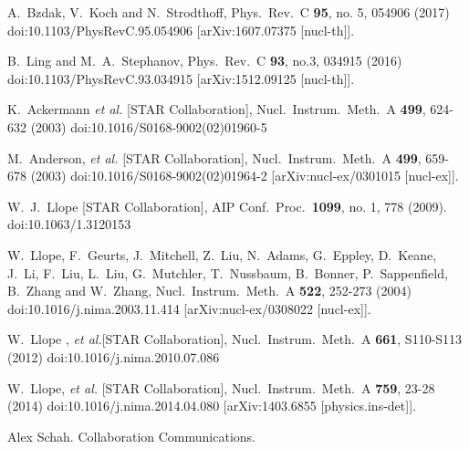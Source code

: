 \begin{thebibliography}{99}
  A.~Bzdak, V.~Koch and N.~Strodthoff,
  Phys.\ Rev.\ C {\bf 95}, no. 5, 054906 (2017)
  doi:10.1103/PhysRevC.95.054906
  [arXiv:1607.07375 [nucl-th]].
  

B.~Ling and M.~A.~Stephanov,
Phys.\ Rev.\ C \textbf{93}, no.3, 034915 (2016)
doi:10.1103/PhysRevC.93.034915
[arXiv:1512.09125 [nucl-th]].

K.~Ackermann \textit{et al.} [STAR Collaboration],
Nucl.\ Instrum.\ Meth.\ A \textbf{499}, 624-632 (2003)
doi:10.1016/S0168-9002(02)01960-5

M.~Anderson, \textit{et al.} [STAR Collaboration],
Nucl.\ Instrum.\ Meth.\ A \textbf{499}, 659-678 (2003)
doi:10.1016/S0168-9002(02)01964-2
[arXiv:nucl-ex/0301015 [nucl-ex]].

  W.~J.~Llope [STAR Collaboration],
  AIP Conf.\ Proc.\  {\bf 1099}, no. 1, 778 (2009).
  doi:10.1063/1.3120153
  
W.~Llope, F.~Geurts, J.~Mitchell, Z.~Liu, N.~Adams, G.~Eppley, D.~Keane, J.~Li, F.~Liu, L.~Liu, G.~Mutchler, T.~Nussbaum, B.~Bonner, P.~Sappenfield, B.~Zhang and W.~Zhang,
Nucl.\ Instrum.\ Meth.\ A \textbf{522}, 252-273 (2004)
doi:10.1016/j.nima.2003.11.414
[arXiv:nucl-ex/0308022 [nucl-ex]].

W.~Llope , \textit{et al.}[STAR Collaboration],
Nucl.\ Instrum.\ Meth.\ A \textbf{661}, S110-S113 (2012)
doi:10.1016/j.nima.2010.07.086

W.~Llope, \textit{et al.} [STAR Collaboration],
Nucl.\ Instrum.\ Meth.\ A \textbf{759}, 23-28 (2014)
doi:10.1016/j.nima.2014.04.080
[arXiv:1403.6855 [physics.ins-det]].

Alex Schah. Collaboration Communications.


\end{thebibliography}
